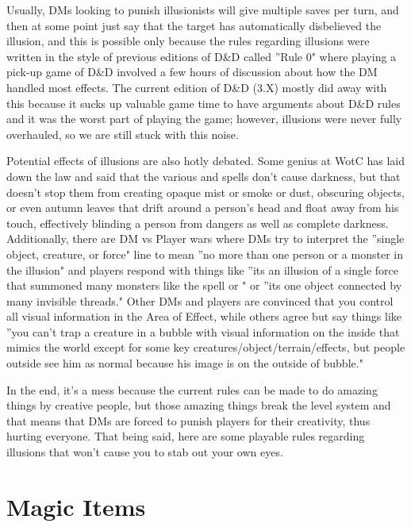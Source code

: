 Usually, DMs looking to punish illusionists will give multiple saves per turn, and then at some point just say that the target has automatically disbelieved the illusion, and this is possible only because the rules regarding illusions were written in the style of previous editions of D\&D called ''Rule 0" where playing a pick-up game of D\&D involved a few hours of discussion about how the DM handled most effects. The current edition of D\&D (3.X) mostly did away with this because it sucks up valuable game time to have arguments about D\&D rules and it was the worst part of playing the game; however, illusions were never fully overhauled, so we are still stuck with this noise.

Potential effects of illusions are also hotly debated. Some genius at WotC has laid down the law and said that the various  and  spells don't cause darkness, but that doesn't stop them from creating opaque mist or smoke or dust, obscuring objects, or even autumn leaves that drift around a person's head and float away from his touch, effectively blinding a person from dangers as well as complete darkness. Additionally, there are DM vs Player wars where DMs try to interpret the ''single object, creature, or force" line to mean ''no more than one person or a monster in the illusion" and players respond with things like ''its an illusion of a single force that summoned many monsters like the spell  or " or ''its one object connected by many invisible threads." Other DMs and players are convinced that you control all visual information in the Area of Effect, while others agree but say things like ''you can't trap a creature in a bubble with visual information on the inside that mimics the world except for some key creatures/object/terrain/effects, but people outside see him as normal because his image is on the outside of bubble."

In the end, it's a mess because the current rules can be made to do amazing things by creative people, but those amazing things break the level system and that means that DMs are forced to punish players for their creativity, thus hurting everyone. That being said, here are some playable rules regarding illusions that won't cause you to stab out your own eyes.

\section{Magic Items}
\vspace*{-8pt}

